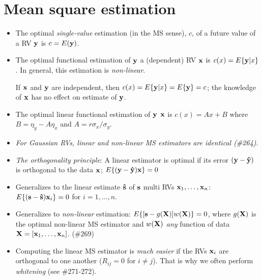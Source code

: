 \documentclass[a4paper, oneside]{book}
\begin{document}
\section{Mean square estimation}
\begin{itemize}
\item The optimal \textit{single-value} estimation (in the MS sense), $c$, of a future value of a RV $\mathbf{y}$ is $c=E(\mathbf{y})$.
\item The optimal functional estimation of $\mathbf{y}$ \ito a (dependent) RV $\mathbf{x}$ is $c(x)=E\{\mathbf{y}|x\}$. In general, this estimation is \textit{non-linear}.

If $\mathbf x$ and $\mathbf y$ are independent, then $c(x) = E\{\mathbf y | x\} = E\{\mathbf y\} = c$; \ie the knowledge of $\mathbf x$ has no effect on estimate of $\mathbf y$.
\item The optimal linear functional estimation of $\mathbf{y}$ \ito $\mathbf{x}$ is $c(x) = Ax + B$ where $B = \eta_y - A\eta_x$ and $A = r \sigma_x/\sigma_y$. 
\item \textit{For Gaussian RVs, linear and non-linear MS estimators are identical (\#264)}.
\item \textit{The orthogonality principle}: A linear estimator is optimal if its error $(\mathbf y - \mathbf{\hat{y}})$ is orthogonal to the data $\mathbf x$; \ie $E\{(\mathbf{y}-\mathbf{\hat{y}})\mathbf{x}\}=0$
	\item Generalizes to the linear estimate $\mathbf{\hat{s}}$ of $\mathbf{s}$ \ito multi RVs $\mathbf{x}_1, \hdots, \mathbf{x}_n$: $E\{(\mathbf{s}-\mathbf{\hat{s}})\mathbf{x}_i\}=0$ for $i=1,\hdots,n$.
	\item Generalizes to \textit{non-linear} estimation: $E\{[\mathbf{s}-g(\mathbf{X})]w(\mathbf{X})\}=0$, where $g(\mathbf{X})$ is the optimal non-linear MS estimator and $w(\mathbf{X})$ \textit{any} function of data $\mathbf{X}=[\mathbf{x}_1,\hdots,\mathbf{x}_n]$. (\#269)
\item Computing the linear MS estimator is \textit{much easier} if the RVs $\mathbf{x}_i$ are orthogonal to one another (\ie $R_{ij}=0$ for $i\neq j$).  That is why we often perform \textit{whitening} (see \#271-272).
\end{itemize}
\end{document}
